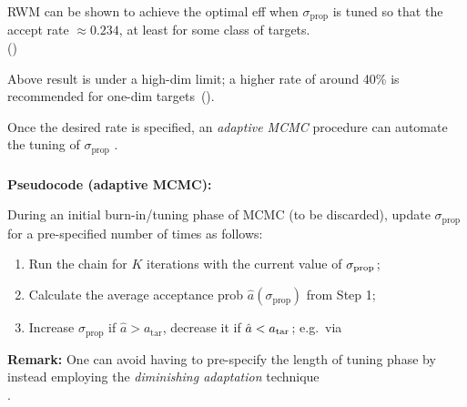 \documentclass[18pt]{beamer}
\newcommand{\defineWithinItemizeSpacing}{%
	\setlength{\abovedisplayskip}{.3\baselineskip}%
	\setlength{\belowdisplayskip}{.3\baselineskip}%
}
\newenvironment{itemizedEquation*}{%
	\defineWithinItemizeSpacing%
	\begin{equation*}
}{
	\end{equation*} \ignorespacesafterend
}
\newcommand{\smallCap}[1]{{\small \MakeUppercase{#1}}}
\newcommand{\thinnerspace}{\mskip.5\thinmuskip}
\newcommand{\tightTo}{\mskip-.4\thinmuskip \to \mskip-.4\thinmuskip}
\newcommand{\propMarker}{\prime}
\newcommand{\acceptProb}{a}
\newcommand{\randVar}{\Theta}
\newcommand{\brandVar}{\bm{\randVar}}
\newcommand{\mcmc}{{\small MCMC}}
\begin{document}
\begin{frame}
\frametitle{\frametitleText}

R\smallCap{wm} can be shown to achieve the optimal eff when $\sigma_\mathrm{prop}$ is tuned so that the accept rate
$\approx 0.234$, at least for some class of targets.\\
{\hfill (\citealt{roberts1997rand_walk_metropolis_scaling})}

\pause
\smallskip
Above result is under a high-dim limit;
a higher rate of around 40\% is recommended for one-dim targets\,
(\citealt{gelman1996eff_jumping}).

\pause
\medskip
Once the desired rate is specified, an \textit{adaptive \mcmc{}} procedure can automate the tuning of $\sigma_\mathrm{prop}$ \citep{andrieu2008adaptive_mcmc}.

\end{frame}


\begin{frame}
\frametitle{\frametitleText}


\textbf{Pseudocode {\normalfont (adaptive \mcmc{})}:}

During an initial burn-in/tuning phase of \mcmc{} (to be discarded), update $\sigma_\mathrm{prop}$ for a pre-specified number of times as follows:
\vspace{-.3\baselineskip}%
\pause%
\begin{enumerate}
\item Run the chain for $K$ iterations with the current value of $\sigma_\mathrm{prop}\thinnerspace$;
	\pause%
\item Calculate the average acceptance prob $\hat{\acceptProb}(\sigma_\mathrm{prop})$ from Step 1;
	\pause%
\item Increase $\sigma_\mathrm{prop}$ if $\hat{\acceptProb} > \acceptProb_\mathrm{tar}$, decrease it if $\hat{\acceptProb} < \acceptProb_\mathrm{tar}\thinnerspace$; e.g.\ via
	\begin{itemizedEquation*}
	\log \sigma_
		\gets \log \sigma_ + \epsilon \thinnerspace (\hat{\acceptProb} - \acceptProb_\mathrm{tar}).
	\end{itemizedEquation*}
\end{enumerate}

\pause
\medskip
\textbf{Remark:} 
One can avoid having to pre-specify the length of tuning phase by instead employing the \textit{diminishing adaptation} technique\\
{\hfill \citep{andrieu2008adaptive_mcmc}.}

\end{frame}
\end{document}
